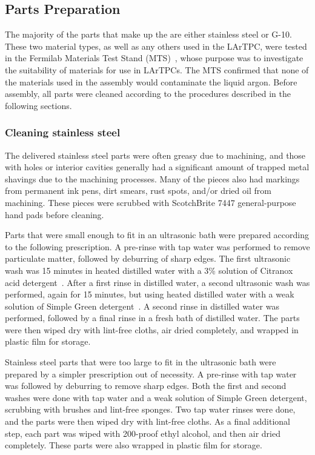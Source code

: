 %
\subsection{Parts Preparation}

The majority of the parts that make up the \lartpc are either stainless steel or G-10. These two material types, as well as any others used in the LArTPC, were tested in the Fermilab Materials Test Stand (MTS)~\cite{Rebel:2011-MTS}, whose purpose was to investigate the suitability of materials for use in LArTPCs.  The MTS confirmed that none of the materials used in the \lartpc assembly would contaminate the liquid argon.  Before assembly, all \lartpc parts were cleaned according to the procedures described in the following sections.

\subsubsection{Cleaning stainless steel}

The delivered stainless steel parts were often greasy due to machining, and those with holes or interior cavities generally had a significant amount of trapped metal shavings due to the machining processes. Many of the pieces also had markings from permanent ink pens, dirt smears, rust spots, and/or dried oil from machining. These pieces were scrubbed with ScotchBrite 7447 general-purpose hand pads before cleaning.

Parts that were small enough to fit in an ultrasonic bath were prepared according to the following prescription. A pre-rinse with tap water was performed to remove particulate matter, followed by deburring of sharp edges. The first ultrasonic wash was 15 minutes in heated distilled water with a 3\% solution of Citranox acid detergent~\cite{citranox}. After a first rinse in distilled water, a second ultrasonic wash was performed, again for 15 minutes, but using heated distilled water with a weak solution of Simple Green detergent~\cite{simplegreen}. A second rinse in distilled water was performed, followed by a final rinse in a fresh bath of distilled water. The parts were then wiped dry with lint-free cloths, air dried completely, and wrapped in plastic film for storage.

Stainless steel parts that were too large to fit in the ultrasonic bath were prepared by a simpler prescription out of necessity. A pre-rinse with tap water was followed by deburring to remove sharp edges. Both the first and second washes were done with tap water and a weak solution of Simple Green detergent, scrubbing with brushes and lint-free sponges. Two tap water rinses were done, and the parts were then wiped dry with lint-free cloths. As a final additional step, each part was wiped with 200-proof ethyl alcohol, and then air dried completely. These parts were also wrapped in plastic film for storage.


